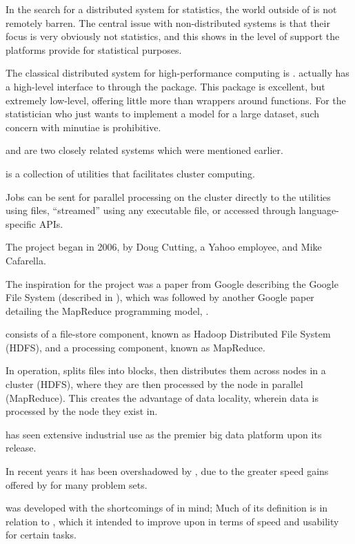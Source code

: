 
In the search for a distributed system for statistics, the world outside
of \R is not remotely barren. The central issue with non-\R distributed
systems is that their focus is very obviously not statistics, and this
shows in the level of support the platforms provide for statistical
purposes.

The classical distributed system for high-performance computing is .
\R actually has a high-level interface to  through the 
package. This package is excellent, but extremely low-level, offering
little more than wrappers around  functions. For the statistician who
just wants to implement a model for a large dataset, such concern with
minutiae is prohibitive.

 and  are two closely related systems which were mentioned
earlier.

 is a collection of utilities that facilitates cluster
computing.

Jobs can be sent for parallel processing on the cluster directly to the
utilities using  files, ``streamed'' using any executable file, or
accessed through language-specific APIs.

The project began in 2006, by Doug Cutting, a Yahoo employee, and Mike
Cafarella.

The inspiration for the project was a paper from Google describing the
Google File System (described in \textcite{ghemawat2003google}), which was
followed by another Google paper detailing the MapReduce programming
model, \textcite{dean2004mapreduce}.

 consists of a file-store component, known as Hadoop Distributed
File System (HDFS), and a processing component, known as MapReduce.

In operation,  splits files into blocks, then distributes them
across nodes in a cluster (HDFS), where they are then processed by the
node in parallel (MapReduce). This creates the advantage of data
locality, wherein data is processed by the node they exist in.

 has seen extensive industrial use as the premier big data
platform upon its release.

In recent years it has been overshadowed by , due to the greater
speed gains offered by  for many problem sets.

 was developed with the shortcomings of  in mind; Much of
its definition is in relation to , which it intended to improve
upon in terms of speed and usability for certain
tasks\cite{zaharia2010spark}.

